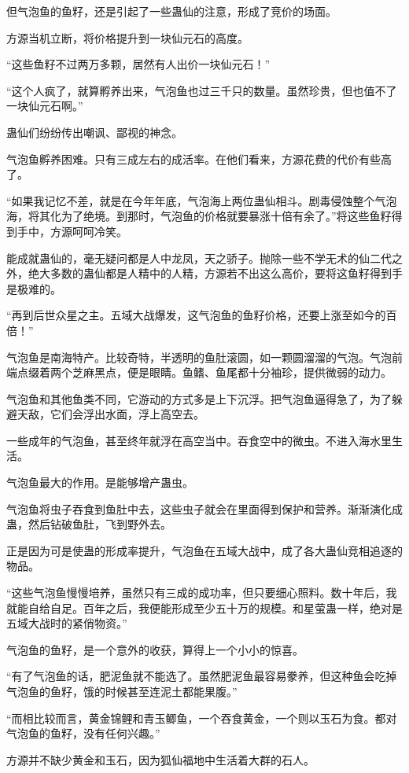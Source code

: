 \begin{this_body}
但气泡鱼的鱼籽，还是引起了一些蛊仙的注意，形成了竞价的场面。

方源当机立断，将价格提升到一块仙元石的高度。

“这些鱼籽不过两万多颗，居然有人出价一块仙元石！”

“这个人疯了，就算孵养出来，气泡鱼也过三千只的数量。虽然珍贵，但也值不了一块仙元石啊。”

蛊仙们纷纷传出嘲讽、鄙视的神念。

气泡鱼孵养困难。只有三成左右的成活率。在他们看来，方源花费的代价有些高了。

“如果我记忆不差，就是在今年年底，气泡海上两位蛊仙相斗。剧毒侵蚀整个气泡海，将其化为了绝境。到那时，气泡鱼的价格就要暴涨十倍有余了。”将这些鱼籽得到手中，方源呵呵冷笑。

能成就蛊仙的，毫无疑问都是人中龙凤，天之骄子。抛除一些不学无术的仙二代之外，绝大多数的蛊仙都是人精中的人精，方源若不出这么高价，要将这鱼籽得到手是极难的。

“再到后世众星之主。五域大战爆发，这气泡鱼的鱼籽价格，还要上涨至如今的百倍！”

气泡鱼是南海特产。比较奇特，半透明的鱼肚滚圆，如一颗圆溜溜的气泡。气泡前端点缀着两个芝麻黑点，便是眼睛。鱼鳍、鱼尾都十分袖珍，提供微弱的动力。

气泡鱼和其他鱼类不同，它游动的方式多是上下沉浮。把气泡鱼逼得急了，为了躲避天敌，它们会浮出水面，浮上高空去。

一些成年的气泡鱼，甚至终年就浮在高空当中。吞食空中的微虫。不进入海水里生活。

气泡鱼最大的作用。是能够增产蛊虫。

气泡鱼将虫子吞食到鱼肚中去，这些虫子就会在里面得到保护和营养。渐渐演化成蛊，然后钻破鱼肚，飞到野外去。

正是因为可是使蛊的形成率提升，气泡鱼在五域大战中，成了各大蛊仙竞相追逐的物品。

“这些气泡鱼慢慢培养，虽然只有三成的成功率，但只要细心照料。数十年后，我就能自给自足。百年之后，我便能形成至少五十万的规模。和星萤蛊一样，绝对是五域大战时的紧俏物资。”

气泡鱼的鱼籽，是一个意外的收获，算得上一个小小的惊喜。

“有了气泡鱼的话，肥泥鱼就不能选了。虽然肥泥鱼最容易豢养，但这种鱼会吃掉气泡鱼的鱼籽，饿的时候甚至连泥土都能果腹。”

“而相比较而言，黄金锦鲤和青玉鲫鱼，一个吞食黄金，一个则以玉石为食。都对气泡鱼的鱼籽，没有任何兴趣。”

方源并不缺少黄金和玉石，因为狐仙福地中生活着大群的石人。


\end{this_body}
